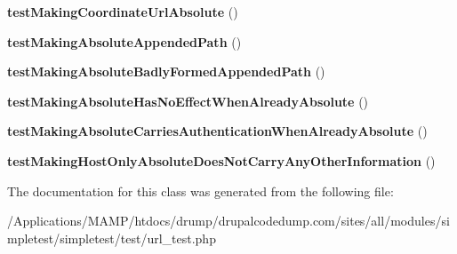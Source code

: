 \begin{DoxyCompactItemize}
\item 
\hypertarget{class_test_of_absolute_urls_a5b8c04953b876fc63bafe0ded433c593}{
{\bfseries testMakingCoordinateUrlAbsolute} ()}
\label{class_test_of_absolute_urls_a5b8c04953b876fc63bafe0ded433c593}

\item 
\hypertarget{class_test_of_absolute_urls_a7d68b710a0425d7aeefd9a1721eccd8b}{
{\bfseries testMakingAbsoluteAppendedPath} ()}
\label{class_test_of_absolute_urls_a7d68b710a0425d7aeefd9a1721eccd8b}

\item 
\hypertarget{class_test_of_absolute_urls_a4b0f944e7a9e38b5dd5a49973491ba44}{
{\bfseries testMakingAbsoluteBadlyFormedAppendedPath} ()}
\label{class_test_of_absolute_urls_a4b0f944e7a9e38b5dd5a49973491ba44}

\item 
\hypertarget{class_test_of_absolute_urls_aebb16b13a989a023886afb80173d3662}{
{\bfseries testMakingAbsoluteHasNoEffectWhenAlreadyAbsolute} ()}
\label{class_test_of_absolute_urls_aebb16b13a989a023886afb80173d3662}

\item 
\hypertarget{class_test_of_absolute_urls_a3f8278bc13cade1593dc0b8cdb2c3778}{
{\bfseries testMakingAbsoluteCarriesAuthenticationWhenAlreadyAbsolute} ()}
\label{class_test_of_absolute_urls_a3f8278bc13cade1593dc0b8cdb2c3778}

\item 
\hypertarget{class_test_of_absolute_urls_a91a7ca8545cd7f3c6b8544cfa1ed0961}{
{\bfseries testMakingHostOnlyAbsoluteDoesNotCarryAnyOtherInformation} ()}
\label{class_test_of_absolute_urls_a91a7ca8545cd7f3c6b8544cfa1ed0961}

\end{DoxyCompactItemize}


The documentation for this class was generated from the following file:\begin{DoxyCompactItemize}
\item 
/Applications/MAMP/htdocs/drump/drupalcodedump.com/sites/all/modules/simpletest/simpletest/test/url\_\-test.php\end{DoxyCompactItemize}

